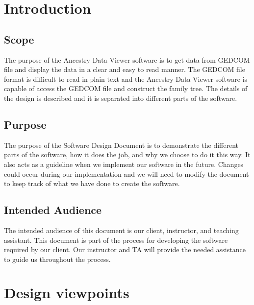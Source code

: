 \documentclass[onecolumn, draftclsnofoot, 10pt, compsoc]{IEEEtran}
\begin{document}
\section{Introduction}
\subsection{Scope}
\begin{singlespace}
The purpose of the Ancestry Data Viewer software is to get data from GEDCOM file and display the data in a clear and easy to read manner. The GEDCOM file format is difficult to read in plain text and the Ancestry Data Viewer software is capable of access the GEDCOM file and construct the family tree. The details of the design is described and it is separated into different parts of the software.
\end{singlespace}

\subsection{Purpose}
\begin{singlespace}
The purpose of the Software Design Document is to demonstrate the different parts of the software, how it does the job, and why we choose to do it this way. It also acts as a guideline when we implement our software in the future. Changes could occur during our implementation and we will need to modify the document to keep track of what we have done to create the software. 
\end{singlespace}

\subsection{Intended Audience}
\begin{singlespace}
The intended audience of this document is our client, instructor, and teaching assistant. This document is part of the process for developing the software required by our client. Our instructor and TA will provide the needed assistance to guide us throughout the process.  
\end{singlespace}

\section{Design viewpoints}
\end{document}
